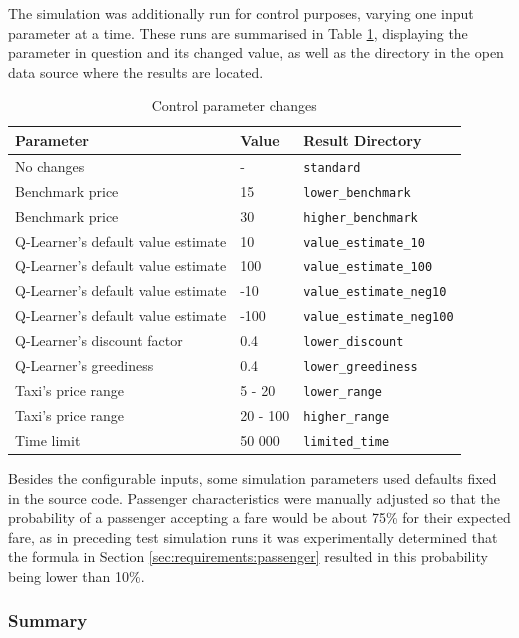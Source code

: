 The simulation was additionally run for control purposes, varying one input
parameter at a time. These runs are summarised in Table
\ref{table:inputs:control}, displaying the parameter in question and its
changed value, as well as the directory in the open data source where the
results are located.

\begin{table}
\begin{tabular}{ | l | l | l | }
  \hline
  Parameter & Value & Result Directory \\ \hline
  No changes & - & \texttt{standard} \\
  Benchmark price & 15 & \texttt{lower\_benchmark} \\
  Benchmark price & 30 & \texttt{higher\_benchmark} \\
  Q-Learner's default value estimate & 10 & \texttt{value\_estimate\_10} \\
  Q-Learner's default value estimate & 100 & \texttt{value\_estimate\_100} \\
  Q-Learner's default value estimate & -10 & \texttt{value\_estimate\_neg10} \\
  Q-Learner's default value estimate & -100 & \texttt{value\_estimate\_neg100} \\
  Q-Learner's discount factor & 0.4 & \texttt{lower\_discount} \\
  Q-Learner's greediness & 0.4 & \texttt{lower\_greediness} \\
  Taxi's price range & 5 - 20 & \texttt{lower\_range} \\
  Taxi's price range & 20 - 100 & \texttt{higher\_range} \\
  Time limit & 50 000 & \texttt{limited\_time} \\
  \hline
\end{tabular}
\caption{
  Control parameter changes
  \label{table:inputs:control}
}
\end{table}

Besides the configurable inputs, some simulation parameters used defaults
fixed in the source code. Passenger characteristics were manually adjusted so
that the probability of a passenger accepting a fare would be about 75\% for
their expected fare, as in preceding test simulation runs it was experimentally
determined that the formula in Section \ref{sec:requirements:passenger}
resulted in this probability being lower than 10\%.


\subsubsection{Summary}

